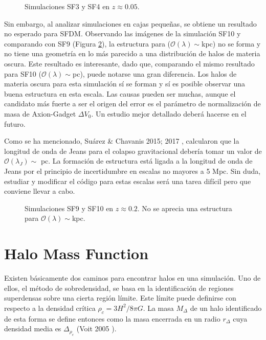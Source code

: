 \documentclass[a4paper,openright,12pt]{book}
\begin{document}
\begin{figure}
\centering
{}
\caption{\footnotesize{Simulaciones SF3 y SF4 en $z\approx0.05$. }}\label{Fig 4.8}
\end{figure}
Sin embargo, al analizar simulaciones en cajas pequeñas, se obtiene un resultado no esperado para SFDM. Observando las imágenes de la simulación SF10 y comparando con SF9 (Figura \ref{Fig 4.9}), la estructura para ($\mathcal{O}(\lambda)\sim$kpc) no se forma y no tiene una geometría en lo más parecido a una distribución de halos de materia oscura. Este resultado es interesante, dado que, comparando el mismo resultado para SF10 ($\mathcal{O}(\lambda)\sim$pc), puede notarse una gran diferencia. Los halos de materia oscura para esta simulación sí se forman y sí es posible observar una buena estructura en esta escala. Las causas pueden ser muchas, aunque el candidato más fuerte a ser el origen del error es el parámetro de normalización de masa de Axion-Gadget $\Delta V_{0}$. Un estudio mejor detallado deberá hacerse en el futuro.

Como se ha mencionado, Suárez \& Chavanis 2015; 2017 \cite{4.3.6, 4.3.7}, calcularon que la longitud de onda de Jeans para el colapso gravitacional debería tomar un valor de $\mathcal{O}(\lambda_{J})\sim$ pc. La formación de estructura está ligada a la longitud de onda de Jeans por el principio de incertidumbre en escalas no mayores a 5 Mpc. Sin duda, estudiar y modificar el código para estas escalas será una tarea difícil pero que conviene llevar a cabo.



\begin{figure}
\centering
{}
\caption{\footnotesize{Simulaciones SF9 y SF10 en $z\approx0.2$. No se aprecia una estructura para $\mathcal{O}(\lambda)\sim$kpc.}}\label{Fig 4.9}
\end{figure}


\section{Halo Mass Function}
Existen básicamente dos caminos para encontrar halos en una simulación. Uno de ellos, el método de sobredensidad, se basa en la identificación de regiones superdensas sobre una cierta región límite. Este límite puede definirse con respecto a la densidad crítica $\rho_{c} = 3H^{2}/ 8\pi G$. La masa $M_{\Delta}$ de un halo identificado de esta forma se define entonces como la masa encerrada en un radio $r_{\Delta}$ cuya densidad media es $\Delta_{\rho_{c}}$ (Voit 2005 \cite{4.4.1}).
\end{document}
